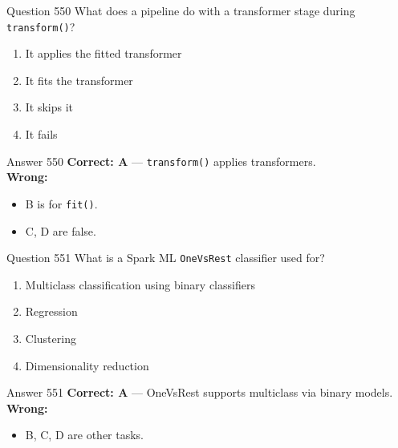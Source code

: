 \documentclass[aspectratio=169,11pt]{beamer}
\begin{document}
	\begin{frame}{Question 550}
		What does a pipeline do with a transformer stage during \texttt{transform()}?
		\begin{enumerate}[label=\Alph*.]
			\item It applies the fitted transformer
			\item It fits the transformer
			\item It skips it
			\item It fails
		\end{enumerate}
	\end{frame}
	\begin{frame}{Answer 550}
		\textbf{Correct: A} --- \texttt{transform()} applies transformers.\\
		\vspace{0.5em}
		\textbf{Wrong:}
		\begin{itemize}
			\item B is for \texttt{fit()}.
			\item C, D are false.
		\end{itemize}
	\end{frame}
	
	\begin{frame}{Question 551}
		What is a Spark ML \texttt{OneVsRest} classifier used for?
		\begin{enumerate}[label=\Alph*.]
			\item Multiclass classification using binary classifiers
			\item Regression
			\item Clustering
			\item Dimensionality reduction
		\end{enumerate}
	\end{frame}
	\begin{frame}{Answer 551}
		\textbf{Correct: A} --- OneVsRest supports multiclass via binary models.\\
		\vspace{0.5em}
		\textbf{Wrong:}
		\begin{itemize}
			\item B, C, D are other tasks.
		\end{itemize}
	\end{frame}
	
\end{document}
